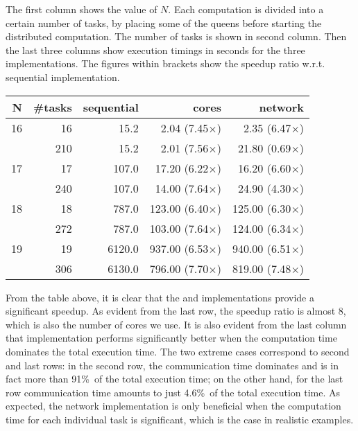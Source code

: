 \documentclass[preprint]{sigplanconf}
\begin{document}
The first column shows the value of $N$.  Each computation is divided
into a certain number of tasks, by placing some of the queens before
starting the distributed computation.  The number of tasks is shown in
second column.  Then the last three columns show execution timings in
seconds for the three implementations. The figures within brackets
show the speedup ratio w.r.t. sequential implementation.
\begin{center}
  \begin{tabular}{|r|r|r|r|r|}
    \hline
    N & \#tasks  & sequential& cores                 & network 
    \\\hline\hline
    16 &   16    &  15.2     &   2.04 (7.45$\times$) &  2.35  (6.47$\times$) 
    \\\hline
       &  210    &  15.2     &   2.01 (7.56$\times$) & 21.80  (0.69$\times$)
    \\\hline
    17 &   17    & 107.0     &  17.20 (6.22$\times$) & 16.20  (6.60$\times$)
    \\\hline
       &  240    & 107.0     &  14.00 (7.64$\times$) & 24.90  (4.30$\times$)
    \\\hline
    18 &   18    & 787.0     & 123.00 (6.40$\times$) & 125.00 (6.30$\times$)  
    \\\hline
       &  272    & 787.0     & 103.00 (7.64$\times$) & 124.00 (6.34$\times$)  
    \\\hline
    19 &   19    &6120.0     & 937.00 (6.53$\times$) & 940.00 (6.51$\times$)  
    \\\hline
       &  306    &6130.0     & 796.00 (7.70$\times$) & 819.00 (7.48$\times$)
    \\\hline
  \end{tabular}
\end{center}
From the table above, it is clear that the  and 
implementations provide a significant speedup. As evident from the
last row, the speedup ratio is almost 8, which is also the number of
cores we use.  It is also evident from the last column that
 implementation performs significantly better when the
computation time dominates the total execution time.  The two extreme
cases correspond to second and last rows: in the second row, the
communication time dominates and is in fact more than 91\%\ of the
total execution time; on the other hand, for the last row
communication time amounts to just 4.6\%\ of the total execution time.
As expected, the network implementation is only beneficial when the
computation time for each individual task is significant, which is the
case in realistic examples.
\end{document}
